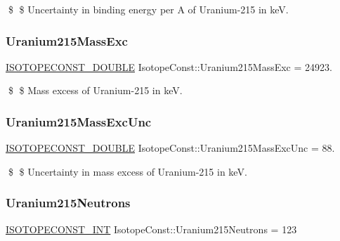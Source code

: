 \$ \$ Uncertainty in binding energy per A of Uranium-\/215 in keV. \mbox{\label{group___isotope_const-_uranium-_u215_gadf43dbbf9271d9ed17465ad190720ee0}} 
\subsubsection{\texorpdfstring{Uranium215\+Mass\+Exc}{Uranium215MassExc}}
{\footnotesize\ttfamily \mbox{\hyperlink{group___isotope_const-_macros_ga8f45a7272ce02c0b4c65c44636ed719a}{I\+S\+O\+T\+O\+P\+E\+C\+O\+N\+S\+T\+\_\+\+D\+O\+U\+B\+LE}} Isotope\+Const\+::\+Uranium215\+Mass\+Exc = 24923.}

\$ \$ Mass excess of Uranium-\/215 in keV. \mbox{\label{group___isotope_const-_uranium-_u215_ga2a7ebe19ca1ddc6736d67ba2a59fbd4a}} 
\subsubsection{\texorpdfstring{Uranium215\+Mass\+Exc\+Unc}{Uranium215MassExcUnc}}
{\footnotesize\ttfamily \mbox{\hyperlink{group___isotope_const-_macros_ga8f45a7272ce02c0b4c65c44636ed719a}{I\+S\+O\+T\+O\+P\+E\+C\+O\+N\+S\+T\+\_\+\+D\+O\+U\+B\+LE}} Isotope\+Const\+::\+Uranium215\+Mass\+Exc\+Unc = 88.}

\$ \$ Uncertainty in mass excess of Uranium-\/215 in keV. \mbox{\label{group___isotope_const-_uranium-_u215_ga6d2c663ece3725042a0722a113801aa1}} 
\subsubsection{\texorpdfstring{Uranium215\+Neutrons}{Uranium215Neutrons}}
{\footnotesize\ttfamily \mbox{\hyperlink{group___isotope_const-_macros_ga5f18360b3e99483a35c32d789e62621c}{I\+S\+O\+T\+O\+P\+E\+C\+O\+N\+S\+T\+\_\+\+I\+NT}} Isotope\+Const\+::\+Uranium215\+Neutrons = 123}

